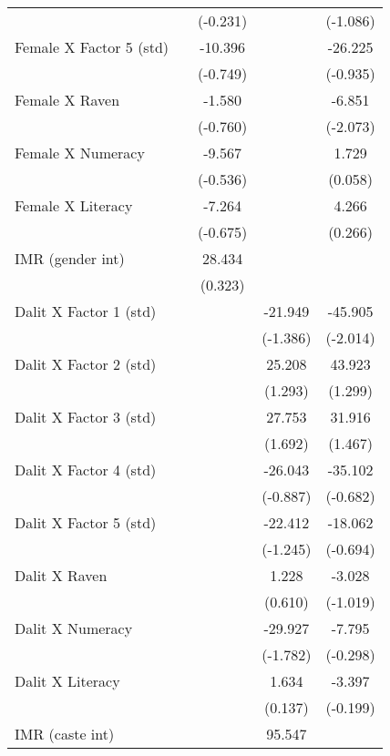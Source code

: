 \begin{table}[htbp]
{\begin{tabular}{lcccc}
          &       & (-0.231) &       & (-1.086) \\
    Female X Factor 5 (std) &       & -10.396 &       & -26.225 \\
          &       & (-0.749) &       & (-0.935) \\
    Female X Raven &       & -1.580 &       & -6.851 \\
          &       & (-0.760) &       & (-2.073) \\
    Female X Numeracy &       & -9.567 &       & 1.729 \\
          &       & (-0.536) &       & (0.058) \\
    Female X Literacy &       & -7.264 &       & 4.266 \\
          &       & (-0.675) &       & (0.266) \\
    IMR (gender int) &       & 28.434 &       &  \\
          &       & (0.323) &       &  \\
    Dalit X Factor 1 (std) &       &       & -21.949 & -45.905 \\
          &       &       & (-1.386) & (-2.014) \\
    Dalit X Factor 2 (std) &       &       & 25.208 & 43.923 \\
          &       &       & (1.293) & (1.299) \\
    Dalit X Factor 3 (std) &       &       & 27.753 & 31.916 \\
          &       &       & (1.692) & (1.467) \\
    Dalit X Factor 4 (std) &       &       & -26.043 & -35.102 \\
          &       &       & (-0.887) & (-0.682) \\
    Dalit X Factor 5 (std) &       &       & -22.412 & -18.062 \\
          &       &       & (-1.245) & (-0.694) \\
    Dalit X Raven &       &       & 1.228 & -3.028 \\
          &       &       & (0.610) & (-1.019) \\
    Dalit X Numeracy &       &       & -29.927 & -7.795 \\
          &       &       & (-1.782) & (-0.298) \\
    Dalit X Literacy &       &       & 1.634 & -3.397 \\
          &       &       & (0.137) & (-0.199) \\
    IMR (caste int) &       &       & 95.547 &  \\

\end{tabular}}
\end{table}
